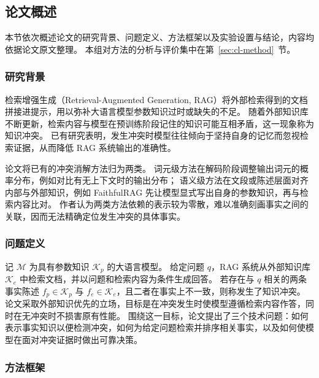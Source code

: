 \subsection{论文概述}
\label{sec:cl-overview}

本节依次概述论文的研究背景、问题定义、方法框架以及实验设置与结论，内容均依据论文原文整理。
本组对方法的分析与评价集中在第~\ref{sec:cl-method}~节。

\subsubsection{研究背景}

检索增强生成（Retrieval-Augmented Generation, RAG）将外部检索得到的文档拼接进提示，用以弥补大语言模型参数知识过时或缺失的不足。
随着外部知识库不断更新，检索内容与模型在预训练阶段记住的知识可能互相矛盾，这一现象称为知识冲突。
已有研究表明，发生冲突时模型往往倾向于坚持自身的记忆而忽视检索证据，从而降低 RAG 系统输出的准确性。

论文将已有的冲突消解方法归为两类。
词元级方法在解码阶段调整输出词元的概率分布，例如对比有无上下文时的输出分布；
语义级方法在文段或陈述层面对齐内部与外部知识，例如 FaithfulRAG 先让模型显式写出自身的参数知识，再与检索内容比对。
作者认为两类方法依赖的表示较为零散，难以准确刻画事实之间的关联，因而无法精确定位发生冲突的具体事实。

\subsubsection{问题定义}

记 $\mathcal{M}$ 为具有参数知识 $\mathcal{K}_p$ 的大语言模型。
给定问题 $q$，RAG 系统从外部知识库 $\mathcal{K}_e$ 中检索文档，并以问题和检索内容为条件生成回答。
若存在与 $q$ 相关的两条事实陈述 $f_p\in\mathcal{K}_p$ 与 $f_e\in\mathcal{K}_e$，且二者在事实上不一致，则称发生了知识冲突。
论文采取外部知识优先的立场，目标是在冲突发生时使模型遵循检索内容作答，同时在无冲突时不损害原有性能。
围绕这一目标，论文提出了三个技术问题：如何表示事实知识以便检测冲突，如何为给定问题检索并排序相关事实，以及如何使模型在面对冲突证据时做出可靠决策。

\subsubsection{方法框架}

